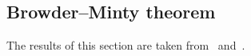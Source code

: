 \documentclass[a4paper,10pt,twoside]{amsbook}
\numberwithin{section}{chapter}
\numberwithin{equation}{chapter}
\theoremstyle{definition}
\newtheorem{thm}[prop]{Theorem}
\DeclarePairedDelimiter{\norm}{\lVert}{\rVert}
\begin{document}
%

\subsection{Browder--Minty theorem}
\label{subsec:minty-browder}

The results of this section are taken from~\cite{intro-pde} and~\cite{roubicek-pde}.
\end{document}

